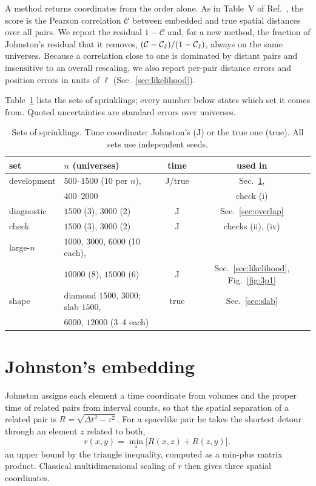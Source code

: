 \documentclass[prd,twocolumn,superscriptaddress,nofootinbib,amsmath,amssymb,floatfix]{revtex4-2}
\begin{document}
A method returns coordinates from the order alone. As in Table~V of Ref.~\cite{Johnston25}, the score is the Pearson correlation $\mathcal C$ between embedded and true spatial distances over all pairs. We report the residual $1-\mathcal C$ and, for a new method, the fraction of Johnston's residual that it removes, $(\mathcal C-\mathcal C_{\rm J})/(1-\mathcal C_{\rm J})$, always on the same universes. Because a correlation close to one is dominated by distant pairs and insensitive to an overall rescaling, we also report per-pair distance errors and position errors in units of $\ell$ (Sec.~\ref{sec:likelihood}).

Table~\ref{tab:sets} lists the sets of sprinklings; every number below states which set it comes from. Quoted uncertainties are standard errors over universes.

\begin{table}[t]
\caption{Sets of sprinklings. Time coordinate: Johnston's (J) or the true one (true). All sets use independent seeds.}
\label{tab:sets}
\setlength{\tabcolsep}{2pt}\small
\begin{ruledtabular}
\begin{tabular}{llcc}
set & $n$ (universes) & time & used in\\
\hline
development & $500$--$1500$ ($10$ per $n$), & J/true & Sec.~\ref{sec:johnston},\\
 & $400$--$2000$ & & check (i)\\
diagnostic & $1500$ (3), $3000$ (2) & J & Sec.~\ref{sec:overlap}\\
check & $1500$ (3), $3000$ (2) & J & checks (ii), (iv)\\
large-$n$ & $1000$, $3000$, $6000$ (10 each),\\
 & $10000$ (8), $15000$ (6) & J & Sec.~\ref{sec:likelihood}, Fig.~\ref{fig:3p1}\\
shape & diamond $1500$, $3000$; slab $1500$, & true & Sec.~\ref{sec:slab}\\
 & $6000$, $12000$ (3--4 each) & & \\
\end{tabular}
\end{ruledtabular}
\end{table}

\section{Johnston's embedding}\label{sec:johnston}
Johnston assigns each element a time coordinate from volumes and the proper time of related pairs from interval counts, so that the spatial separation of a related pair is $R=\sqrt{\Delta t^2-\tau^2}$. For a spacelike pair he takes the shortest detour through an element $z$ related to both,
\begin{equation}
r(x,y)=\min_z\big[R(x,z)+R(z,y)\big],
\label{eq:detour}
\end{equation}
an upper bound by the triangle inequality, computed as a min-plus matrix product. Classical multidimensional scaling of $r$ then gives three spatial coordinates.
\end{document}
